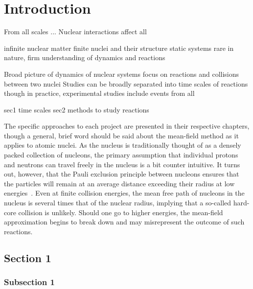 
\chapter{Introduction}\label{chapters:Introduction}
\vspace{-7mm}

From all scales ...
Nuclear interactions affect all

infinite nuclear matter
finite nuclei and their structure
static systems rare in nature, firm understanding of dynamics and reactions

Broad picture of dynamics of nuclear systems
focus on reactions and collisions between two nuclei
Studies can be broadly separated into time scales of reactions
though in practice, experimental studies include events from all

sec1 time scales
sec2 methods to study reactions

The specific approaches to each project are presented in their respective chapters, though a general, brief word should be said about the mean-field method as it applies to atomic nuclei.
As the nucleus is traditionally thought of as a densely packed collection of nucleons, the primary assumption that individual protons and neutrons can travel freely in the nucleus is a bit counter intuitive.
It turns out, however, that the Pauli exclusion principle between nucleons ensures that the particles will remain at an average distance exceeding their radius at low energies~\cite{ring1980}.
Even at finite collision energies, the mean free path of nucleons in the nucleus is several times that of the nuclear radius, implying that a so-called hard-core collision is unlikely.
Should one go to higher energies, the mean-field approximation begins to break down and may misrepresent the outcome of such reactions.


\section{Section 1}\label{sec:ch_1_sec_1}

\subsection{Subsection 1}\label{subsec:subsec_1.1.1}


\clearpage
